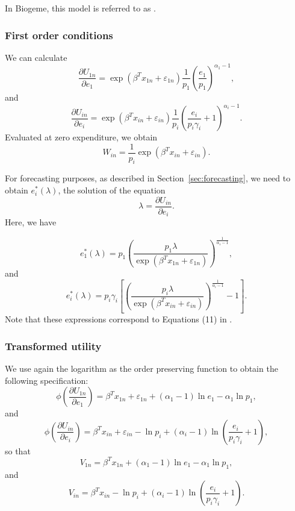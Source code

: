 \documentclass[12pt,a4paper]{article}
\begin{document}
In Biogeme, this model is referred to as \lstinline@generalized@.
\subsubsection*{First order conditions}

We can calculate
\begin{equation}
\frac{\partial U_{1n}}{\partial e_1} =\exp(\beta^T x_{1n} + \varepsilon_{1n}) \frac{1}{p_1} \left(\frac{e_1}{p_1}\right)^{\alpha_1-1},
\end{equation}
and
\begin{equation}
  \frac{\partial U_{in}}{\partial e_i} = \exp(\beta^T x_{in} + \varepsilon_{in}) \frac{1}{p_i} \left(\frac{e_i}{p_i \gamma_i}+1\right)^{\alpha_i-1}.
\end{equation}
Evaluated at zero expenditure, we obtain
\[
    W_{in} =  \frac{1}{p_i} \exp(\beta^T x_{in} + \varepsilon_{in}).
\]

For forecasting purposes, as described in Section~\ref{sec:forecasting}, we need to obtain $e_i^*(\lambda)$, the solution of the equation
\[\lambda = \frac{\partial U_{in}}{\partial e_i}. \]
Here, we have

\begin{equation}
    \label{eq:generalized_optimal_outside}
  e_1^*(\lambda) = p_1\left(\frac{p_1\lambda}{\exp(\beta^T x_{1n} + \varepsilon_{1n})}\right)^{\frac{1}{\alpha_1-1}},
\end{equation}
and
\begin{equation}
    \label{eq:generalized_optimal}
 e_i^*(\lambda) =  p_i \gamma_i \left[\left(\frac{p_i\lambda}{\exp(\beta^T x_{in} + \varepsilon_{in})}\right)^{\frac{1}{\alpha_i-1}}-1\right].
\end{equation}
Note that these expressions correspond to Equations (11) in .

\subsubsection*{Transformed utility}
We use again the logarithm as the order preserving function to obtain the following specification:
\[
\phi\left(\frac{\partial U_{1n}}{\partial e_1}\right) = \beta^T x_{1n} + \varepsilon_{1n} + (\alpha_1-1) \ln e_1 - \alpha_1 \ln p_1,
\]
and
\[
\phi\left(\frac{\partial U_{in}}{\partial e_i}\right) = \beta^T x_{in} + \varepsilon_{in} - \ln p_i + (\alpha_i-1) \ln \left(\frac{e_i}{p_i \gamma_i}+1\right),
\]
so that
\[
V_{1n} = \beta^T x_{1n} + (\alpha_1-1) \ln e_1 - \alpha_1 \ln p_1,
\]
and
\[
V_{in} = \beta^T x_{in} - \ln p_i + (\alpha_i-1) \ln \left(\frac{e_i}{p_i \gamma_i}+1\right).
\]
\end{document}
